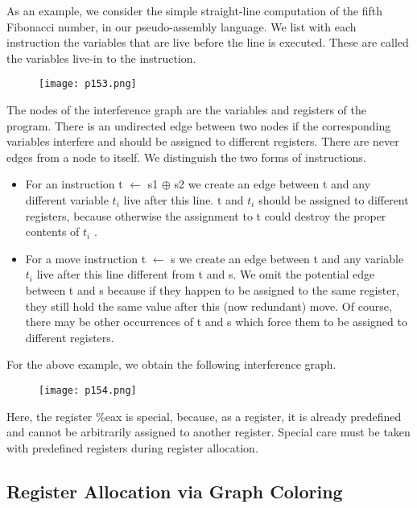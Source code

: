 As an example, we consider the simple straight-line computation of the
fifth Fibonacci number, in our pseudo-assembly language. We list with
each instruction the variables that are live before the line is executed. These
are called the variables live-in to the instruction.


\begin{figure}[H]
	\centering
	\texttt{[image: p153.png]}
	\caption{}
	\label{fig:p153}
\end{figure}

The nodes of the interference graph are the variables and registers of the
program. There is an undirected edge between two nodes if the corresponding variables interfere and should be assigned to different registers.
There are never edges from a node to itself. We distinguish the two forms
of instructions.

\begin{itemize}
    \item For an instruction t $\leftarrow$ s1 $\oplus$ 
    s2 we create an edge between t and any
    different variable $t_i$ live after this line. t and $t_i$ should be assigned to
    different registers, because otherwise the assignment to t could destroy the proper contents of $t_i$
    .
    \item For a move instruction t $\leftarrow$ s we create an edge between t and any
    variable $t_i$
    live after this line different from t and s. We omit the potential edge between t and s because if they happen to be assigned to the same register, they still hold the same value after this (now redundant) move. Of course, there may be other occurrences of t and s
    which force them to be assigned to different registers.
\end{itemize}    

For the above example, we obtain the following interference graph.
\begin{figure}[H]
	\centering
	\texttt{[image: p154.png]}
	\caption{}
	\label{fig:p154}
\end{figure}

Here, the register \%eax is special, because, as a register, it is already predefined and cannot be arbitrarily assigned to another register. Special care
must be taken with predefined registers during register allocation. 




\subsection{ Register Allocation via Graph Coloring}


